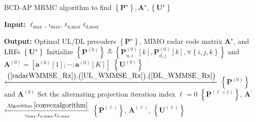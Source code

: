 \documentclass[10pt,journal]{IEEEtran}
\newcommand{\paren}[1]{\left({#1}\right)}
\newcommand{\bracket}[1]{{\left [{#1}\right ]}}
\newcommand{\braces}[1]{{\left\{ {#1}\right\}}}
\newcommand{\rr}{_\mathrm{r}}
\newcommand{\B}{\textrm{B}}
\newcommand{\rnr}{_{\mathrm{r},n_\mathrm{r}}}
\newcommand{\HrB}{\mathbf{H}_{\textrm{rB}}}
\newcommand{\Hrj}{\mathbf{H}_{\textrm{r},j}}
\newcommand{\HBj}{\mathbf{H}_{\textrm{B},j}}
\newcommand{\HiB}{\mathbf{H}_{i,\textrm{B}}}
\theoremstyle{definition}
\begin{document}
		\begin{algorithm}[ht!]
			\par\noindent\small
			\caption{BCD-AP MRMC algorithm to find $\braces{\mathbf{P}^\star},\mathbf{A}^\star,\braces{\mathbf{U}^\star}$}
			\label{Alternating_sum}
			\begin{algorithmic}[1]
				\Statex \textbf{Input:} $\mathrm{\ell}_{\textrm{max}}$, $\mathrm{\iota}_{\textrm{max}}$, $t_{\textrm{u,max}}$ $t_{\textrm{d,max}}$
				
				\Statex \textbf{Output:} Optimal UL/DL precoders $\braces{\mathbf{P}^\star}$, MIMO radar code matrix $\mathbf{A}^\star$, and LRFs $\braces{\mathbf{U}^\star}$
				\State Initialize $\braces{\mathbf{P}^{\paren{\mathrm{0}}}}\triangleq
				\braces{\mathbf{P}^{\paren{\mathrm{0}}}_{\textrm{u},i}\bracket{k},\mathbf{P}^{\paren{\mathrm{0}}}_{\textrm{d},j}\bracket{k}, \forall \braces{i,j,k}}$ and $\mathbf{A}^{\paren{\mathrm{0}}}=\bracket{\mathbf{a}^{\paren{\mathrm{0}}}\bracket{1};\cdots;\mathbf{a}^{\paren{\mathrm{0}}}\bracket{\mathrm{\mathit{K}}}}$
				\State %
				$\braces{\mathbf{U}^{\paren{\mathrm{0}}}}$ $\xleftarrow{\mathrm{\paren{\ref{radarWMMSE_Rx}}},\mathrm{\paren{\ref{UL_WMMSE_Rx}}},\mathrm{\paren{\ref{DL_WMMSE_Rx}}}}$  $\braces{\mathbf{P}^{\paren{\mathrm{0}}}}$ and $\mathbf{A}^{\paren{\mathrm{0}}}$ 
				\State Set the alternating projection iteration index $\mathrm{\ell=0}$
				\Repeat \; 
				\State $\braces{\mathbf{P}^{\paren{\mathrm{\ell+1}}}}$, $\mathbf{A}^\prime$ $\xleftarrow[\mathrm{\iota}_{\textrm{max}},t_{\textrm{u,max}},t_{\textrm{d,max}}]{\textrm{Algorithm }\ref{convexalgorithm}}$ $\braces{\mathbf{P}^{\paren{\mathrm{\ell}}}}$, $\mathbf{A}^{\paren{\mathrm{\ell}}}$, $\braces{\mathbf{U}^{\paren{\mathrm{\ell}}}}$  %

\end{algorithmic}
\end{algorithm}
\end{document}
